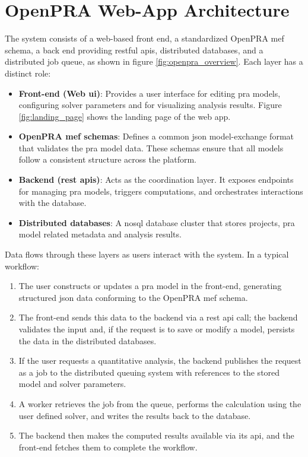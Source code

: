 \section{OpenPRA Web-App Architecture}
The system consists of a web-based front end, a standardized OpenPRA \acrfull{mef} schema, a back end providing \acrfull{rest}ful \acrfull{api}s, distributed databases, and a distributed job queue, as shown in figure \ref{fig:openpra_overview}. Each layer has a distinct role:



\begin{itemize}
\item \textbf{Front-end (Web \acrshort{ui})}: Provides a user interface for editing \acrshort{pra} models, configuring solver parameters and for visualizing analysis results. Figure \ref{fig:landing_page} shows the landing page of the web app.
\item \textbf{OpenPRA \acrshort{mef} schemas}: Defines a common \acrshort{json} model-exchange format that validates the \acrshort{pra} model data. These schemas ensure that all models follow a consistent structure across the platform.
\item \textbf{Backend (\acrshort{rest} \acrfull{api}s)}: Acts as the coordination layer. It exposes endpoints for managing \acrshort{pra} models, triggers computations, and orchestrates interactions with the database.
\item \textbf{Distributed databases}: A \acrfull{nosql} database cluster that stores projects, \acrshort{pra} model related metadata and analysis results.
\end{itemize}

Data flows through these layers as users interact with the system. In a typical workflow:
\begin{enumerate}
\item The user constructs or updates a \acrshort{pra} model in the front-end, generating structured \acrshort{json} data conforming to the OpenPRA \acrshort{mef} schema.
\item The front-end sends this data to the backend via a \acrshort{rest} \acrshort{api} call; the backend validates the input and, if the request is to save or modify a model, persists the data in the distributed databases.
\item If the user requests a quantitative analysis, the backend publishes the request as a job to the distributed queuing system with references to the stored model and solver parameters.
\item A worker retrieves the job from the queue, performs the calculation using the user defined solver, and writes the results back to the database.
\item The backend then makes the computed results available via its \acrshort{api}, and the front-end fetches them to complete the workflow.
\end{enumerate}
